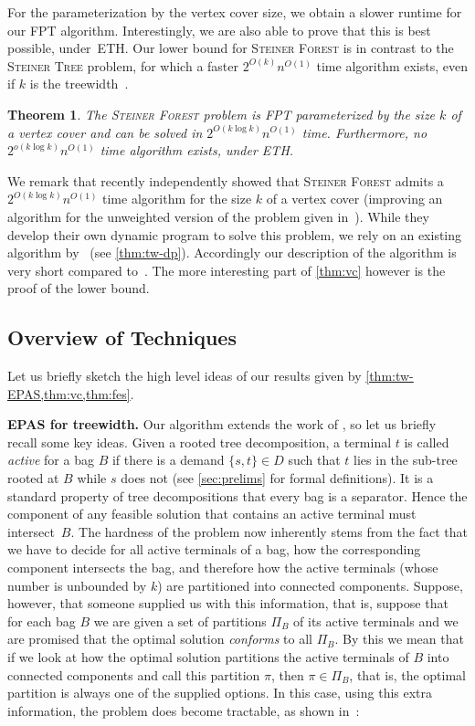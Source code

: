 \documentclass[a4paper]{article}
\let\oldcitet\citet
\renewcommand{\citet}[1]{\mbox{\oldcitet{#1}}}
\theoremstyle{plain}
\newtheorem{theorem}{Theorem}%
\newcommand{\pname}[1]{\textsc{#1}}
\newcommand{\SF}{\pname{Steiner Forest}\xspace}
\newcommand{\ST}{\pname{Steiner Tree}\xspace}
\begin{document}
For the parameterization by the vertex cover size, we obtain a slower runtime
for our FPT algorithm. Interestingly, we are also able to prove that this is
best possible, under~ETH. Our lower bound for \SF is in contrast to the \ST
problem, for which a faster $2^{O(k)}n^{O(1)}$ time algorithm exists, even if
$k$ is the treewidth~\cite{bodlaender2015deterministic}.

\begin{theorem}\label{thm:vc}
The \SF problem is FPT parameterized by the size $k$ of a vertex cover and can be solved in $2^{O(k\log k)}n^{O(1)}$ time. Furthermore, no $2^{o(k\log k)}n^{O(1)}$ time algorithm exists, under ETH.
\end{theorem}

We remark that \citet{bodlaender2023complexity} recently independently showed 
that \SF admits a~$2^{O(k\log k)}n^{O(1)}$ time algorithm for the size $k$ of a 
vertex cover (improving an algorithm for the unweighted version of the problem 
given in~\cite{GimaHKKO22}). While they develop their own dynamic program to 
solve this problem, we rely on an existing algorithm 
by~\cite{bateni2011approximation} (see \autoref{thm:tw-dp}). Accordingly our 
description of the algorithm is very short compared 
to~\cite{bodlaender2023complexity}. The more interesting part of 
\autoref{thm:vc} however is the proof of the lower bound.

%
%
%

\subsection{Overview of Techniques}

%
%
%
%
Let us briefly sketch the high level ideas of our results given by \cref{thm:tw-EPAS,thm:vc,thm:fes}.

\smallskip
\textbf{EPAS for treewidth.} Our algorithm extends
the work of \cite{bateni2011approximation}, so let us briefly recall some key
ideas. 
Given a rooted tree decomposition, a terminal $t$ is called \emph{active} for a bag $B$
if there is a demand $\{s,t\}\in D$ such that $t$ lies in the sub-tree rooted at $B$
while $s$ does not (see \cref{sec:prelims} for formal definitions). 
It is a standard property of tree decompositions that every bag is a separator.
Hence the
component of any feasible solution that contains an active terminal must intersect~$B$. 
The hardness of the problem now inherently stems from the fact
that we have to decide for all active terminals of a bag, how
the corresponding component intersects the bag, and therefore how the active
terminals (whose number is unbounded by $k$) are partitioned into connected
components.  Suppose, however, that someone supplied us with this information,
that is, suppose that for each bag $B$ we are given a set of partitions $\Pi_B$
of its active terminals and we are promised that the optimal solution
\emph{conforms} to all $\Pi_B$. By this we mean that if we look at how the
optimal solution partitions the active terminals of $B$ into connected
components and call this partition $\pi$, then $\pi\in \Pi_B$, that is, the
optimal partition is always one of the supplied options. In this case, using
this extra information, the problem does become tractable, as shown in~\cite{bateni2011approximation}:
\end{document}
